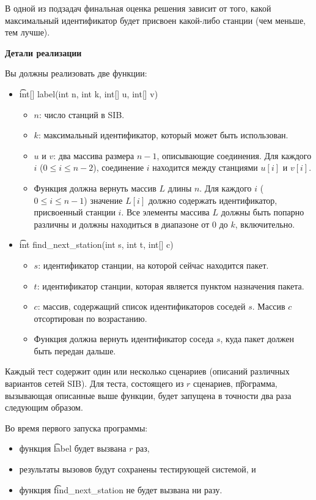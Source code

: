 В одной из подзадач финальная оценка решения зависит от того, какой максимальный идентификатор будет присвоен какой-либо станции (чем меньше, тем лучше).

\textbf{Детали реализации}

Вы должны реализовать две функции:

\begin{itemize}
\item \t{int[] label(int n, int k, int[] u, int[] v)}
\begin{itemize}
\item $n$: число станций в SIB.
\item $k$: максимальный идентификатор, который может быть использован.
\item $u$ и $v$: два массива размера $n-1$, описывающие соединения. Для каждого $i$ ($0 \leq i \leq n-2$), соединение $i$ находится между станциями $u[i]$ и $v[i]$.
\item Функция должна вернуть массив $L$ длины $n$. Для каждого $i$ ($0 \leq i \leq n-1$) значение $L[i]$ должно содержать идентификатор, присвоенный станции $i$. Все элементы массива $L$ должны быть попарно различны и должны находиться в диапазоне от $0$ до $k$, включительно.
\end{itemize}

\item \t{int find\_next\_station(int s, int t, int[] c)}
\begin{itemize}

\item $s$: идентификатор станции, на которой сейчас находится пакет.
\item $t$: идентификатор станции, которая является пунктом назначения пакета.
\item $c$: массив, содержащий список идентификаторов соседей $s$. Массив $c$ отсортирован по возрастанию.
\item Функция должна вернуть идентификатор соседа $s$, куда пакет должен быть передан дальше.
\end{itemize}
\end{itemize}

Каждый тест содержит один или несколько сценариев (описаний различных вариантов сетей SIB).
Для теста, состоящего из $r$ сценариев, \t{программа}, вызывающая описанные выше функции, будет запущена в точности два раза следующим образом.

Во время первого запуска программы:
\begin{itemize}
\item функция \t{label} будет вызвана $r$ раз,
\item результаты вызовов будут сохранены тестирующей системой, и
\item функция \t{find\_next\_station} не будет вызвана ни разу.
\end{itemize}

